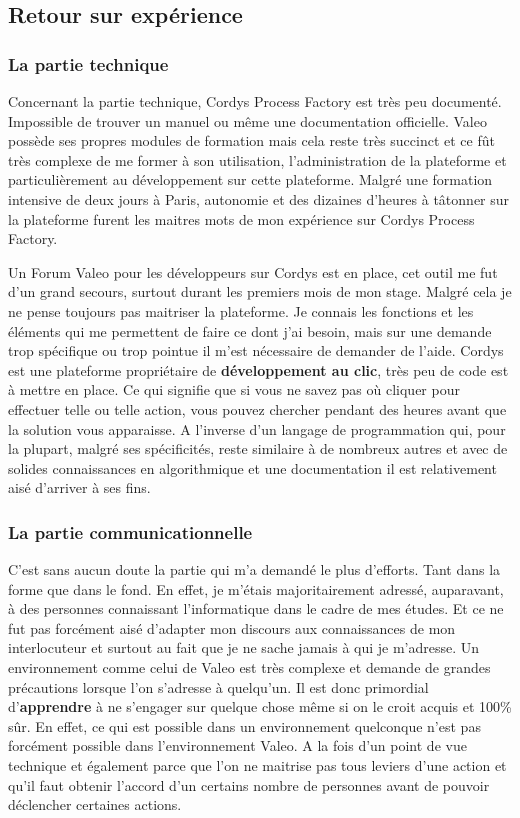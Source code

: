 \clearpage

\subsection{Retour sur expérience}

\subsubsection{La partie technique}

Concernant la partie technique, Cordys Process Factory est très peu documenté. Impossible de trouver un manuel ou même une documentation officielle. Valeo possède ses propres modules de formation mais cela reste très succinct et ce fût très complexe de me former à  son utilisation, l'administration de la plateforme et particulièrement au développement sur cette plateforme. Malgré une formation intensive de deux jours à Paris, autonomie et des dizaines d'heures à tâtonner sur la plateforme furent les maitres mots de mon expérience sur Cordys Process Factory.

Un Forum Valeo pour les développeurs sur Cordys est en place, cet outil me fut d'un grand secours, surtout durant les premiers mois de mon stage.
Malgré cela je ne pense toujours pas maitriser la plateforme. Je connais les fonctions et les éléments qui me permettent de faire ce dont j'ai besoin, mais sur une demande trop spécifique ou trop pointue il m'est nécessaire de demander de l'aide. Cordys est une plateforme propriétaire de \textbf{développement au clic}, très peu de code est à mettre en place. Ce qui signifie que si vous ne savez pas où cliquer pour effectuer telle ou telle action, vous pouvez chercher pendant des heures avant que la solution vous apparaisse. A l'inverse d'un langage de programmation qui, pour la plupart, malgré ses spécificités, reste similaire à de nombreux autres et avec de solides connaissances en algorithmique et une documentation il est relativement aisé d'arriver à ses fins.

\subsubsection{La partie communicationnelle}

C'est sans aucun doute la partie qui m'a demandé le plus d'efforts. Tant dans la forme que dans le fond. En effet, je m'étais majoritairement adressé, auparavant, à des personnes connaissant l'informatique dans le cadre de mes études. Et ce ne fut pas forcément aisé d'adapter mon discours aux connaissances de mon interlocuteur et surtout au fait que je ne sache jamais à qui je m'adresse. Un environnement comme celui de Valeo est très complexe et demande de grandes précautions lorsque l'on s'adresse à quelqu'un. Il est donc primordial d'\textbf{apprendre} à ne s'engager sur quelque chose même si on le croit acquis et 100\% sûr. En effet, ce qui est possible dans un environnement quelconque n'est pas forcément possible dans l'environnement Valeo. A la fois d'un point de vue technique et également parce que l'on ne maitrise pas tous leviers d'une action et qu'il faut obtenir l'accord d'un certains nombre de personnes avant de pouvoir déclencher certaines actions.

